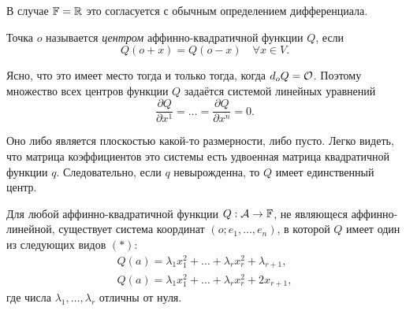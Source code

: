 В случае $\mathbb{F} = \mathbb{R}$ это согласуется с обычным определением дифференциала.

\begin{definition}
    Точка $o$ называется \textit{центром} аффинно-квадратичной функции $Q$, если
    \[
        Q(o + x) = Q(o - x)\quad\forall x \in V.
    \]
\end{definition}

Ясно, что это имеет место тогда и только тогда, когда $d_oQ = \mathcal{O}$. Поэтому множество всех центров функции $Q$ задаётся системой линейных уравнений
\[
    \frac{\partial Q}{\partial x^1} = \ldots = \frac{\partial Q}{\partial x^n} = 0.
\]

Оно либо является плоскостью какой-то размерности, либо пусто. Легко видеть, что матрица коэффициентов это системы есть удвоенная матрица квадратичной функции $q$. Следовательно, если $q$ невырожденна, то $Q$ имеет единственный центр.

\begin{theorem}
    Для любой аффинно-квадратичной функции $Q: \mathcal{A} \to \mathbb{F}$, не являющеся аффинно-линейной, существует система координат $(o; e_1, \ldots, e_n)$, в которой $Q$ имеет один из следующих видов $(\ast)$:
    \begin{gather*}
        Q(a) = \lambda_1x_1^2 + \ldots + \lambda_rx_r^2 + \lambda_{r + 1},\\
        Q(a) = \lambda_1x_1^2 + \ldots + \lambda_rx_r^2 + 2x_{r + 1},
    \end{gather*}
    где числа $\lambda_1, \ldots, \lambda_r$ отличны от нуля.
\end{theorem}

